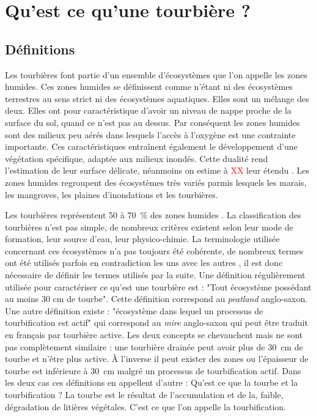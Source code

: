 \section{Qu'est ce qu'une tourbière ?}

\subsection{Définitions}
Les tourbières font partie d'un ensemble d'écosystèmes que l'on appelle les zones humides.
Ces zones humides se définissent comme n'étant ni des écosystèmes terrestres au sens strict ni des écosystèmes aquatiques.
Elles sont un mélange des deux.
Elles ont pour caractéristique d'avoir un niveau de nappe proche de la surface du sol, quand ce n'est pas au dessus.
Par conséquent les zones humides sont des milieux peu aérés dans lesquels l'accès à l'oxygène est une contrainte importante.
Ces caractéristiques entraînent également le développement d'une végétation spécifique, adaptée aux milieux inondés.
Cette dualité rend l'estimation de leur surface délicate, néanmoins on estime à \textcolor{red}{XX} leur étendu \plop.
Les zones humides regroupent des écosystèmes très variés parmis lesquels les marais, les mangroves, les plaines d'inondations et les tourbières.

Les tourbières représentent 50 à \SI{70}{\percent} des zones humides \cite{francez2000,joosten2002}.
La classification des tourbières n'est pas simple, de nombreux critères existent selon leur mode de formation, leur source d'eau, leur physico-chimie.
La terminologie utilisée concernant ces écosystèmes n'a pas toujours été cohérente, de nombreux termes ont été utilisés parfois en contradiction les uns avec les autres \cite{joosten2002}, il est donc nécessaire de définir les termes utilisés par la suite. 
Une définition régulièrement utilisée pour caractériser ce qu'est une tourbière est : "Tout écosystème possédant au moins 30 cm de tourbe".
Cette définition correspond au \textit{peatland} anglo-saxon.
Une autre définition existe  : "écosystème dans lequel un processus de tourbification est actif" qui correspond au \textit{mire} anglo-saxon qui peut être traduit en français par tourbière active.
Les deux concepts se chevauchent mais ne sont pas complètement similaire : une tourbière drainée peut avoir plus de \SI{30}{cm} de tourbe et n'être plus active.
À l'inverse il peut exister des zones ou l'épaisseur de tourbe est inférieure à \SI{30}{cm} malgré un processus de tourbification actif.
Dans les deux cas ces définitions en appellent d'autre : Qu'est ce que la tourbe et la tourbification ?
La tourbe est le résultat de l'accumulation et de la, faible, dégradation de litières végétales.
C'est ce que l'on appelle la tourbification.

